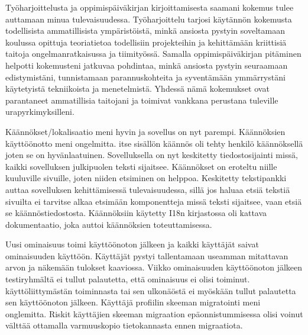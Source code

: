\documentclass[11pt,a4paper,titlepage,oneside]{article}
\begin{document}
%
Työharjoittelusta ja oppimispäiväkirjan kirjoittamisesta saamani kokemus tulee auttamaan minua tulevaisuudessa.
Työharjoittelu tarjosi käytännön kokemusta todellisista ammatillisista ympäristöistä,
minkä ansiosta pystyin soveltamaan koulussa opittuja teoriatietoa todellisiin projekteihin ja kehittämään kriittisiä taitoja 
ongelmanratkaisussa ja tiimityössä.
Samalla oppimispäiväkirjan pitäminen helpotti kokemusteni jatkuvaa pohdintaa,
minkä ansiosta pystyin seuraamaan edistymistäni,
tunnistamaan parannuskohteita ja syventämään ymmärrystäni käytetyistä tekniikoista ja menetelmistä.
Yhdessä nämä kokemukset ovat parantaneet ammatillisia taitojani ja toimivat vankkana perustana tuleville urapyrkimyksilleni.
\medskip













\iffalse

Käännökset/lokalisaatio meni hyvin ja sovellus on nyt parempi.
Käännöksien käyttöönotto meni ongelmitta.
itse sisällön käännös oli tehty henkilö käännöksellä joten se on hyvänlaatuinen.
%
Sovelluksella on nyt keskitetty tiedostosijainti missä, kaikki sovelluksen julkipuolen teksti sijaitsee.
Käännökset on eroteltu niille kuuluville sivuille, joten niiden etsiminen on helppoa.
Keskitetty tekstipankki auttaa sovelluksen kehittämisessä tulevaisuudessa,
sillä jos haluaa etsiä tekstiä sivuilta ei tarvitse alkaa etsimään komponentteja missä teksti sijaitsee,
vaan etsiä se käännöstiedostosta.
%
Käännöksiin käytetty I18n kirjastossa oli kattava dokumentaatio, joka auttoi käännöksien toteuttamisessa.
\medskip



Uusi ominaisuus toimi käyttöönoton jälkeen ja kaikki käyttäjät saivat ominaisuuden käyttöön.
Käyttäjät pystyi tallentamaan useamman mitattavan arvon ja näkemään tulokset kaaviossa. %
Viikko ominaisuuden käyttöönoton jälkeen testiryhmältä ei tullut palautetta, että ominaisuus ei olisi toiminut.
%
käyttöliittymästän toiminnasta tai sen ulkonäöstä ei myöskään tullut palautetta sen käyttöönoton jälkeen.
%
Käyttäjä profiilin skeeman migratointi meni onglemitta.
Riskit käyttäjien skeeman migraation epäonnistummisessa olisi voinut välttää ottamalla varmuuskopio tietokannasta ennen migraatiota.
\medskip
\end{document}
